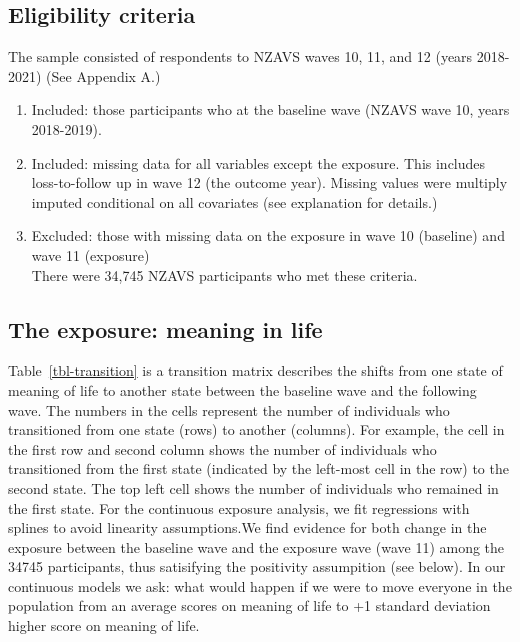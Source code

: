 \documentclass[
  singlecolumn]{report}
\providecommand{\tightlist}{%
  \setlength{\itemsep}{0pt}\setlength{\parskip}{0pt}}\usepackage{longtable,booktabs,array}
\begin{document}
\hypertarget{eligibility-criteria}{%
\subsection{Eligibility criteria}\label{eligibility-criteria}}

The sample consisted of respondents to NZAVS waves 10, 11, and 12 (years
2018-2021) (See Appendix A.)

\begin{enumerate}
\def\labelenumi{\arabic{enumi}.}
\tightlist
\item
  Included: those participants who at the baseline wave (NZAVS wave 10,
  years 2018-2019).
\item
  Included: missing data for all variables except the exposure. This
  includes loss-to-follow up in wave 12 (the outcome year). Missing
  values were multiply imputed conditional on all covariates (see
  explanation for details.)
\item
  Excluded: those with missing data on the exposure in wave 10
  (baseline) and wave 11 (exposure)\\
  There were 34,745 NZAVS participants who met these criteria.
\end{enumerate}

\hypertarget{the-exposure-meaning-in-life}{%
\subsection{The exposure: meaning in
life}\label{the-exposure-meaning-in-life}}

Table~\ref{tbl-transition} is a transition matrix describes the shifts
from one state of meaning of life to another state between the baseline
wave and the following wave. The numbers in the cells represent the
number of individuals who transitioned from one state (rows) to another
(columns). For example, the cell in the first row and second column
shows the number of individuals who transitioned from the first state
(indicated by the left-most cell in the row) to the second state. The
top left cell shows the number of individuals who remained in the first
state. For the continuous exposure analysis, we fit regressions with
splines to avoid linearity assumptions.We find evidence for both change
in the exposure between the baseline wave and the exposure wave (wave
11) among the 34745 participants, thus satisifying the positivity
assumpition (see below). In our continuous models we ask: what would
happen if we were to move everyone in the population from an average
scores on meaning of life to +1 standard deviation higher score on
meaning of life.
\end{document}

